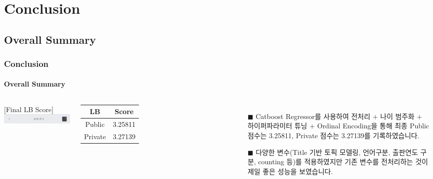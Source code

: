 \documentclass{beamer}
\begin{document}
\section{Conclusion}



\subsection{Overall Summary}


\begin{frame}
\frametitle{Conclusion}
\framesubtitle{Overall Summary}

\begin{columns}
\centering

[Final LB Score]\\
\vspace{1.5mm}
\includegraphics[scale=0.49]{LB rating.png}\\
\vspace{1.5mm}
\begin{tabular}{| c | c |}
  \hline
  LB & Score                    			                \\   \hline
  Public & 3.25811                                          \\   \hline
  Private & 3.27139                                          \\   \hline
\end{tabular}

\begin{itemize}
\item[$\blacksquare$] {\footnotesize Catboost Regressor를 사용하여 전처리 $+$ 나이 범주화 $+$ 하이퍼파라미터 튜닝 $+$ Ordinal Encoding을 통해 최종 Public 점수는 3.25811, Private 점수는 3.27139를 기록하였습니다.} \\
\item[$\blacksquare$] {\footnotesize 다양한 변수(Title 기반 토픽 모델링, 언어구분, 출판연도 구분, counting 등)를 적용하였지만 기존 변수를 전처리하는 것이 제일 좋은 성능을 보였습니다.}
\end{itemize}
\end{columns}
\end{frame}
\end{document}
